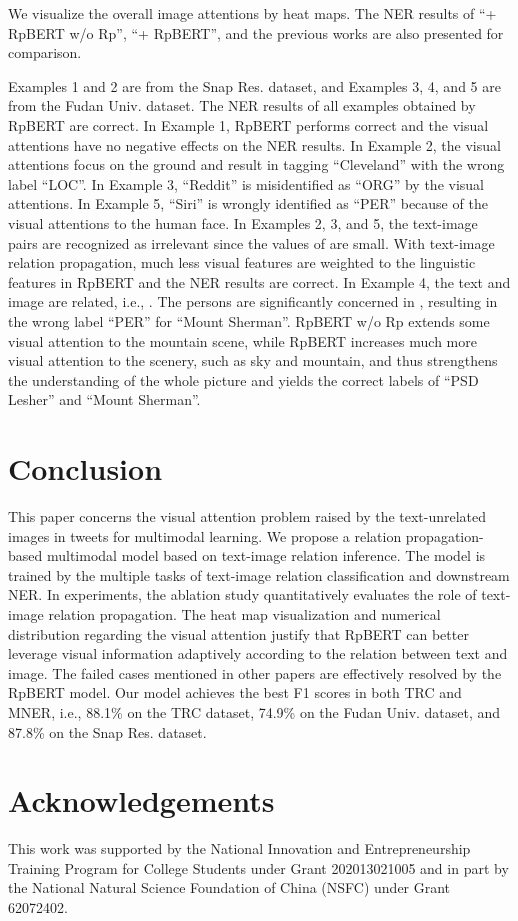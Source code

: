 \documentclass[letterpaper]{article} \usepackage{aaai21}  \usepackage{times}  \usepackage{helvet} \usepackage{courier}  \usepackage[hyphens]{url}  \usepackage{graphicx} \urlstyle{rm} \def\UrlFont{\rm}  \usepackage{natbib}  \usepackage{caption} \frenchspacing  \setlength{\pdfpagewidth}{8.5in}  \setlength{\pdfpageheight}{11in}
\begin{document}
We visualize the overall image attentions  by heat maps.
The NER results of ``+ RpBERT w/o Rp'', ``+ RpBERT'', and the previous works are also presented for comparison.

Examples 1 and 2 are from the Snap Res. dataset, and Examples 3, 4, and 5 are from the Fudan Univ. dataset.
The NER results of all examples obtained by  RpBERT are correct.
In Example 1,  RpBERT performs correct  and the visual attentions have no negative effects on the NER results.   
In Example 2, the visual attentions focus on the ground and result in  tagging ``Cleveland'' with the wrong label ``LOC''.
In Example 3, ``Reddit'' is misidentified as ``ORG'' by  the visual attentions.
In Example 5, ``Siri'' is wrongly identified as ``PER'' because of  the visual attentions to the human face.
In Examples 2, 3, and 5, the text-image pairs are recognized as irrelevant since the values of  are small.
With text-image relation propagation, much less visual features are weighted to the linguistic features in RpBERT and the NER results are  correct.
In Example 4, the text and image are related, i.e., .
The persons are significantly concerned in \cite{arshad2019aiding}, resulting in the wrong label ``PER'' for ``Mount Sherman''.
RpBERT w/o Rp extends some visual attention to the mountain scene,
while RpBERT increases much more visual attention to the scenery, such as sky and mountain, and thus strengthens the understanding of the whole picture and yields the correct labels of ``PSD Lesher'' and ``Mount Sherman''.





\section{Conclusion}
This paper concerns the visual attention problem raised by the text-unrelated images in tweets for multimodal learning.
We propose a relation propagation-based multimodal model based on text-image relation inference.
The model is trained by the multiple tasks of  text-image relation classification and downstream NER.
In experiments, the ablation study quantitatively evaluates the role of text-image relation propagation.
The heat map visualization and  numerical distribution regarding the visual attention justify that RpBERT can better leverage visual information adaptively according to the relation between text and image.
The failed cases mentioned in other papers are effectively resolved by the RpBERT model.
Our model achieves the best F1 scores in both TRC and MNER, i.e., 88.1\% on the TRC dataset, 74.9\% on the Fudan Univ. dataset, and 87.8\% on the Snap Res. dataset.



\section{Acknowledgements}
This work was supported by the National Innovation and Entrepreneurship Training Program for College Students under Grant 202013021005 
and in part by the National Natural Science Foundation of China (NSFC) under Grant 62072402.



\end{document}
